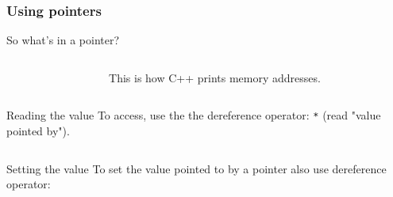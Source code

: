 \documentclass{beamer}
\begin{document}
\begin{frame}[fragile]
  \frametitle{Using pointers}
  
  \begin{block}{So what's in a pointer?}
	  \begin{columns}[t]
	    \begin{column}[T]{0.5\textwidth}
			  
			\end{column}\pause
			\begin{column}[T]{0.5\textwidth}
			  \newline
			  This is how C++ prints memory addresses.
	    \end{column}
	  \end{columns}
  \end{block}
  \pause
  \begin{block}{Reading the value}
  	To access, use the the dereference operator: \texttt{*} (read "value pointed by").
  	\begin{columns}[t]
  	  \begin{column}[T]{0.5\textwidth}
 
  	  \end{column}\pause
  	  \begin{column}[T]{0.5\textwidth}
  	  \end{column}
  	\end{columns}
  \end{block}
  \pause
  \begin{block}{Setting the value}
    To set the value pointed to by a pointer also use dereference operator:
  	\begin{columns}[t]
  	  \begin{column}[T]{0.5\textwidth}
  	  \end{column}\pause
  	  \begin{column}[T]{0.5\textwidth}
  	  \end{column}
  	\end{columns}
  \end{block}
\end{frame}
\end{document}
